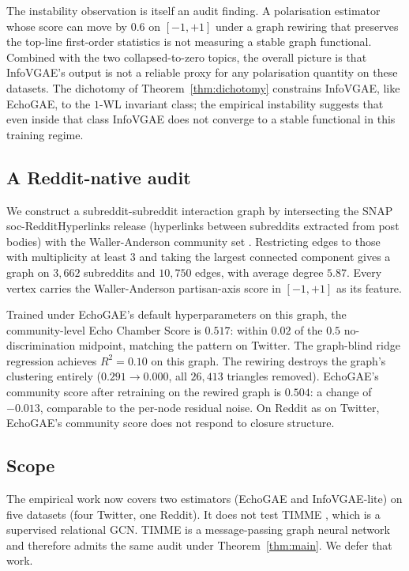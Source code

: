 The instability observation is itself an audit finding. A
polarisation estimator whose score can move by $0.6$ on
$[-1, +1]$ under a graph rewiring that preserves the top-line
first-order statistics is not measuring a stable graph functional.
Combined with the two collapsed-to-zero topics, the overall picture
is that InfoVGAE's output is not a reliable proxy for any
polarisation quantity on these datasets. The dichotomy of
Theorem~\ref{thm:dichotomy} constrains InfoVGAE, like EchoGAE, to the
$1$-WL invariant class; the empirical instability suggests that
even inside that class InfoVGAE does not converge to a stable
functional in this training regime.

\subsection{A Reddit-native audit}\label{sec:emp-reddit-native}

We construct a subreddit-subreddit interaction graph by intersecting
the SNAP soc-RedditHyperlinks release \citep{KumarRedditHyperlinks2018}
(hyperlinks between subreddits extracted from post bodies) with the
Waller-Anderson community set \citep{WallerAnderson2021}. Restricting
edges to those with multiplicity at least $3$ and taking the largest
connected component gives a graph on $3{,}662$ subreddits and
$10{,}750$ edges, with average degree $5.87$. Every vertex carries
the Waller-Anderson partisan-axis score in $[-1, +1]$ as its feature.

Trained under EchoGAE's default hyperparameters on this graph, the
community-level Echo Chamber Score is $0.517$: within $0.02$ of the
$0.5$ no-discrimination midpoint, matching the pattern on Twitter.
The graph-blind ridge regression achieves $R^2 = 0.10$ on this
graph. The rewiring destroys the graph's clustering entirely
($0.291 \to 0.000$, all $26{,}413$ triangles removed). EchoGAE's
community score after retraining on the rewired graph is $0.504$: a
change of $-0.013$, comparable to the per-node residual noise. On
Reddit as on Twitter, EchoGAE's community score does not respond to
closure structure.

\subsection{Scope}

The empirical work now covers two estimators (EchoGAE and
InfoVGAE-lite) on five datasets (four Twitter, one Reddit). It does
not test TIMME \citep{XiaoTIMME2020}, which is a supervised
relational GCN. TIMME is a message-passing graph neural network and
therefore admits the same audit under Theorem~\ref{thm:main}. We defer that
work.

